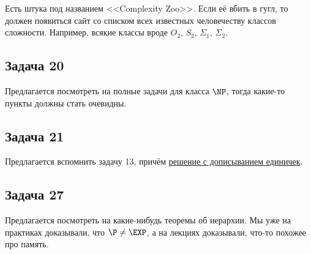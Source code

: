 	Есть штука под названием <<Complexity Zoo>>.
	Если её вбить в гугл, то должен появиться сайт со списком всех известных человечеству классов сложности.
	Например, всякие классы вроде $O_2$, $S_2$, $\Sigma_1$, $\Sigma_2$.

\subsection{Задача 20}
	Предлагается посмотреть на полные задачи для класса $\NP$, тогда какие-то пункты должны стать очевидны.

\subsection{Задача 21}
	Предлагается вспомнить задачу 13, причём \hyperref[prob13_sol2]{решение с дописыванием единичек}.

\subsection{Задача 27}
	Предлагается посмотреть на какие-нибудь теоремы об иерархии.
	Мы уже на практиках доказывали, что $\P \neq \EXP$, а на лекциях доказывали, что-то похожее про память.
